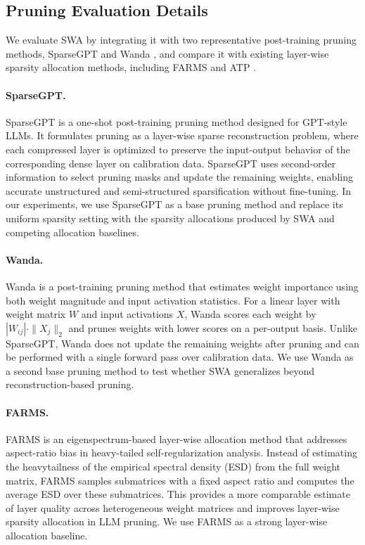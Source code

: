 \subsection{Pruning Evaluation Details}
\label{sec:swa_pruning_eval_details}

We evaluate SWA by integrating it with two representative post-training pruning methods, SparseGPT \cite{frantar2023sparsegpt} and Wanda \cite{sun2023simple}, and compare it with existing layer-wise sparsity allocation methods, including FARMS \cite{hu2025eigenspectrum} and ATP \cite{huang2025determining}.

\paragraph{SparseGPT.}
SparseGPT is a one-shot post-training pruning method designed for GPT-style LLMs. It formulates pruning as a layer-wise sparse reconstruction problem, where each compressed layer is optimized to preserve the input-output behavior of the corresponding dense layer on calibration data. SparseGPT uses second-order information to select pruning masks and update the remaining weights, enabling accurate unstructured and semi-structured sparsification without fine-tuning. In our experiments, we use SparseGPT as a base pruning method and replace its uniform sparsity setting with the sparsity allocations produced by SWA and competing allocation baselines.

\paragraph{Wanda.}
Wanda is a post-training pruning method that estimates weight importance using both weight magnitude and input activation statistics. For a linear layer with weight matrix $W$ and input activations $X$, Wanda scores each weight by $|W_{ij}|\cdot \|X_j\|_2$ and prunes weights with lower scores on a per-output basis. Unlike SparseGPT, Wanda does not update the remaining weights after pruning and can be performed with a single forward pass over calibration data. We use Wanda as a second base pruning method to test whether SWA generalizes beyond reconstruction-based pruning.

\paragraph{FARMS.}
FARMS is an eigenspectrum-based layer-wise allocation method that addresses aspect-ratio bias in heavy-tailed self-regularization analysis. Instead of estimating the heavytailness of the empirical spectral density (ESD) from the full weight matrix, FARMS samples submatrices with a fixed aspect ratio and computes the average ESD over these submatrices. This provides a more comparable estimate of layer quality across heterogeneous weight matrices and improves layer-wise sparsity allocation in LLM pruning. We use FARMS as a strong layer-wise allocation baseline.

